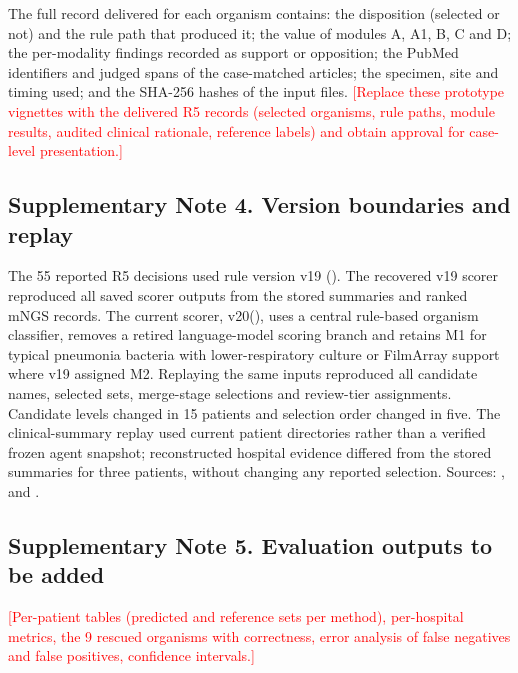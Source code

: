 \documentclass[11pt,a4paper]{article}
\newcommand{\mngs}{mNGS\xspace}
\newcommand{\filmarray}{FilmArray\xspace}
\newcommand{\rfive}{R5\xspace}
\newcommand{\vtwenty}{v20\xspace}
\newcommand{\todo}[1]{\textcolor{red}{[#1]}}
\begin{document}
The full record delivered for each organism contains: the disposition (selected or not) and the rule path that produced it; the value of modules A, A1, B, C and D; the per-modality findings recorded as support or opposition; the PubMed identifiers and judged spans of the case-matched articles; the specimen, site and timing used; and the SHA-256 hashes of the input files. \todo{Replace these prototype vignettes with the delivered \rfive records (selected organisms, rule paths, module results, audited clinical rationale, reference labels) and obtain approval for case-level presentation.}

\subsection*{Supplementary Note 4. Version boundaries and replay}
The 55 reported \rfive decisions used rule version v19 (). The recovered v19 scorer reproduced all saved scorer outputs from the stored summaries and ranked \mngs records. The current scorer, \vtwenty (), uses a central rule-based organism classifier, removes a retired language-model scoring branch and retains M1 for typical pneumonia bacteria with lower-respiratory culture or \filmarray support where v19 assigned M2. Replaying the same inputs reproduced all candidate names, selected sets, merge-stage selections and review-tier assignments. Candidate levels changed in 15 patients and selection order changed in five. The clinical-summary replay used current patient directories rather than a verified frozen agent snapshot; reconstructed hospital evidence differed from the stored summaries for three patients, without changing any reported selection. Sources: ,  and .

\subsection*{Supplementary Note 5. Evaluation outputs to be added}
\todo{Per-patient tables (predicted and reference sets per method), per-hospital metrics, the 9 rescued organisms with correctness, error analysis of false negatives and false positives, confidence intervals.}
\end{document}
